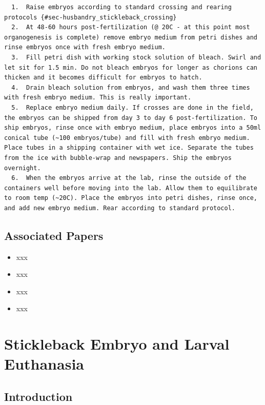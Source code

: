 \documentclass[
  letterpaper,
  DIV=11,
  numbers=noendperiod]{scrreprt}
\providecommand{\tightlist}{%
  \setlength{\itemsep}{0pt}\setlength{\parskip}{0pt}}\usepackage{longtable,booktabs,array}
\begin{document}
\begin{verbatim}
  1.  Raise embryos according to standard crossing and rearing protocols {#sec-husbandry_stickleback_crossing}
  2.  At 48-60 hours post-fertilization (@ 20C - at this point most organogenesis is complete) remove embryo medium from petri dishes and rinse embryos once with fresh embryo medium.
  3.  Fill petri dish with working stock solution of bleach. Swirl and let sit for 1.5 min. Do not bleach embryos for longer as chorions can thicken and it becomes difficult for embryos to hatch.
  4.  Drain bleach solution from embryos, and wash them three times with fresh embryo medium. This is really important.
  5.  Replace embryo medium daily. If crosses are done in the field, the embryos can be shipped from day 3 to day 6 post-fertilization. To ship embryos, rinse once with embryo medium, place embryos into a 50ml conical tube (~100 embryos/tube) and fill with fresh embryo medium. Place tubes in a shipping container with wet ice. Separate the tubes from the ice with bubble-wrap and newspapers. Ship the embryos overnight.
  6.  When the embryos arrive at the lab, rinse the outside of the containers well before moving into the lab. Allow them to equilibrate to room temp (~20C). Place the embryos into petri dishes, rinse once, and add new embryo medium. Rear according to standard protocol.
\end{verbatim}

\hypertarget{associated-papers-35}{%
\section{Associated Papers}\label{associated-papers-35}}

\begin{itemize}
\tightlist
\item
  xxx
\item
  xxx
\item
  xxx
\item
  xxx
\end{itemize}

\hypertarget{sec-husbandry_euthanasia_stickleback}{%
\chapter{Stickleback Embryo and Larval
Euthanasia}\label{sec-husbandry_euthanasia_stickleback}}

\hypertarget{introduction-55}{%
\section{Introduction}\label{introduction-55}}
\end{document}
